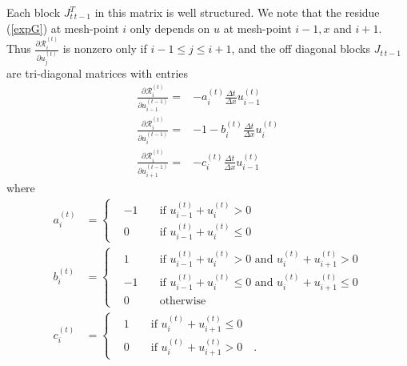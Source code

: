 \documentclass{elsart}
\theoremstyle{remark}
\theoremstyle{definition}
\theoremstyle{proof}
\begin{document}
    Each block $J_{t\,t-1}^T$ in this matrix is well structured.  We note
    that the residue (\ref{expG}) at mesh-point $i$ only depends on $u$ at
    mesh-point $i-1,x$ and $i+1$.  Thus
    $\frac{\partial \mathcal{R}_i^{(t)}}{\partial u_j^{(t)}}$
    is nonzero only if $i-1\le j\le i+1$,
    and the off diagonal blocks $J_{t\, t-1}$ are tri-diagonal matrices
    with entries
    \begin{equation} \label{burgerR} \begin{split}
       \frac{\partial \mathcal{R}_i^{(t)}}{\partial u_{i-1}^{(t-1)}}
       =& - a_i^{(t)} \frac{\Delta t}{\Delta x} u_{i-1}^{(t)} \\
       \frac{\partial \mathcal{R}_i^{(t)}}{\partial u_{i  }^{(t-1)}}
       =& - 1 - b_i^{(t)} \frac{\Delta t}{\Delta x} u_{i}^{(t)} \\
       \frac{\partial \mathcal{R}_i^{(t)}}{\partial u_{i+1}^{(t-1)}}
       =& - c_i^{(t)} \frac{\Delta t}{\Delta x} u_{i-1}^{(t)}
    \end{split} \end{equation}
    where
    \[ \begin{split}
       a_i^{(t)} &= \left\{ \begin{aligned}
                        & -1 && \mbox{ if } u_{i-1}^{(t)} + u_i^{(t)} > 0 \\
                        & 0 && \mbox{ if } u_{i-1}^{(t)} + u_i^{(t)} \le 0
                    \end{aligned} \right. \\
       b_i^{(t)} &= \left\{ \begin{aligned}
                        & 1 && \mbox{ if } u_{i-1}^{(t)} + u_i^{(t)} > 0
                            \mbox{ and } u_i^{(t)} + u_{i+1}^{(t)} > 0 \\
                        & -1 && \mbox{ if } u_{i-1}^{(t)} + u_i^{(t)} \le 0
                            \mbox{ and } u_i^{(t)} + u_{i+1}^{(t)} \le 0 \\
                        & 0 && \mbox{ otherwise }
                    \end{aligned} \right. \\
       c_i^{(t)} &= \left\{ \begin{aligned}
                        & 1 && \mbox{ if } u_i^{(t)} + u_{i+1}^{(t)} \le 0 \\
                        & 0 && \mbox{ if } u_i^{(t)} + u_{i+1}^{(t)} > 0
                            \quad .
                    \end{aligned} \right.
    \end{split} \]
    
\end{document}
